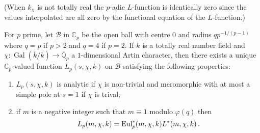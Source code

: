 \documentclass{amsart}
\begin{document}
(When $ k_\chi $ is not totally real the {$p$-adic{\futurelet{}}} {$L$-function{\futurelet{}}} is
identically zero since the values interpolated are all zero by the
functional equation of the {$L$-function{\futurelet{}}}.)

\begin{theorem}\label{padicLfunction}
For $ p $ prime, let $\mathcal{B}$ in $ {{\mathbb C_p}} $ be the open ball with centre $0$ and radius $qp^{-1/(p-1)}$
where $q = p$ if $ p>2 $ and $ q=4 $ if $p=2$.
If $ k $ is a totally real number field 
and $ \chi : {\operatorname{Gal}}({\overline{k}}/k) \to {{\overline {\mathbb Q}_p}} $ a $ 1 $-dimensional Artin character, then there exists a unique 
$ {{\mathbb C_p}} $-valued function $ {L_{p}(s,{\chi},k)}$ on $ \mathcal{B} $
satisfying the following properties:
  \begin{enumerate}
  \item ${L_{p}(s,{\chi},k)}$ is analytic if $\chi$ is non-trivial and
     meromorphic with at most a simple pole at $s = 1$ if $\chi$ is trival;
  \item if $m$ is a negative integer such that $m \equiv 1 $ modulo $\varphi(q)$ then
    \begin{equation*}
      {L_{p}(m,{\chi},k)}= {\textup{Eul}}^\ast_p(m,\chi,k) {L^\ast(m,{\chi},k)}
      \,. 
    \end{equation*}
  \end{enumerate}
\end{theorem}
\end{document}
